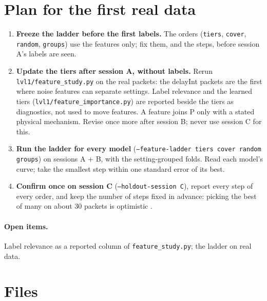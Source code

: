 \documentclass[10pt]{article}
\newcommand{\code}[1]{\texttt{#1}}
\begin{document}
\section{Plan for the first real data}
\label{sec:plan}

\begin{enumerate}
  \item \textbf{Freeze the ladder before the first labels.} The orders (\code{tiers}, \code{cover}, \code{random},
        \code{groups}) use the features only; fix them, and the steps, before session A's labels are seen.
  \item \textbf{Update the tiers after session A, without labels.} Rerun \code{lvl1/feature\_study.py} on the real
        packets: the delayInt packets are the first where noise features can separate settings. Label relevance and the
        learned tiers (\code{lvl1/feature\_importance.py}) are reported beside the tiers as diagnostics, not used to move
        features. A feature joins P only with a stated physical mechanism. Revise once more after session B; never use
        session C for this.
  \item \textbf{Run the ladder for every model} (\code{--feature-ladder tiers cover random groups}) on sessions A + B,
        with the setting-grouped folds. Read each model's curve; take the smallest step within one standard error of
        its best.
  \item \textbf{Confirm once on session C} (\code{--holdout-session C}), report every step of every order, and keep the
        number of steps fixed in advance: picking the best of many on about 30 packets is optimistic \cite{cawley2010}.
\end{enumerate}

\paragraph{Open items.} Label relevance as a reported column of \code{feature\_study.py}; the ladder on real data.

\section{Files}
\end{document}
